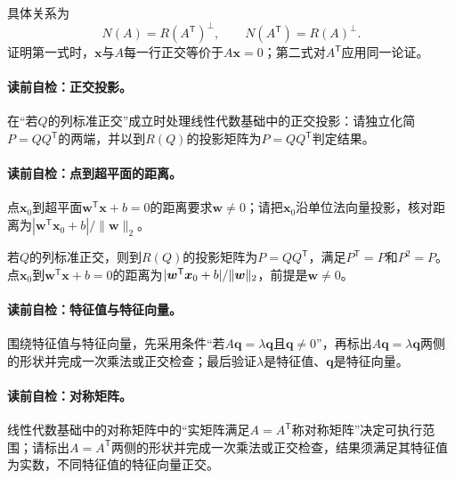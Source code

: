 具体关系为
\[
N(A)=R(A^{\mathsf T})^{\perp},\qquad
N(A^{\mathsf T})=R(A)^{\perp}.
\]
证明第一式时，$\boldsymbol{x}$与$A$每一行正交等价于$A\boldsymbol{x}=0$；第二式对$A^{\mathsf T}$应用同一论证。

\paragraph{读前自检：正交投影。}在“若$Q$的列标准正交”成立时处理线性代数基础中的正交投影：请独立化简$P=QQ^{\mathsf T}$的两端，并以到$R(Q)$的投影矩阵为$P=QQ^{\mathsf T}$判定结果。\par
\paragraph{读前自检：点到超平面的距离。}点$\boldsymbol x_0$到超平面$\boldsymbol w^{\mathsf T}\boldsymbol x+b=0$的距离要求$\boldsymbol w\ne0$；请把$\boldsymbol x_0$沿单位法向量投影，核对距离为$|\boldsymbol w^{\mathsf T}\boldsymbol x_0+b|/\lVert\boldsymbol w\rVert_2$。\par

若$Q$的列标准正交，则到$R(Q)$的投影矩阵为$P=QQ^{\mathsf T}$，满足$P^{\mathsf T}=P$和$P^2=P$。
点$\boldsymbol{x}_0$到$\boldsymbol{w}^{\mathsf T}\boldsymbol{x}+b=0$的距离为$|\boldsymbol{w}^{\mathsf T}\boldsymbol{x}_0+b|/\lVert\boldsymbol{w}\rVert_2$，前提是$\boldsymbol{w}\ne0$。


\paragraph{读前自检：特征值与特征向量。}围绕特征值与特征向量，先采用条件“若$A\boldsymbol{q}=\lambda\boldsymbol{q}$且$\boldsymbol{q}\ne0$”，再标出$A\boldsymbol{q}=\lambda\boldsymbol{q}$两侧的形状并完成一次乘法或正交检查；最后验证$\lambda$是特征值、$\boldsymbol{q}$是特征向量。\par
\paragraph{读前自检：对称矩阵。}线性代数基础中的对称矩阵中的“实矩阵满足$A=A^{\mathsf T}$称对称矩阵”决定可执行范围；请标出$A=A^{\mathsf T}$两侧的形状并完成一次乘法或正交检查，结果须满足其特征值为实数，不同特征值的特征向量正交。\par

